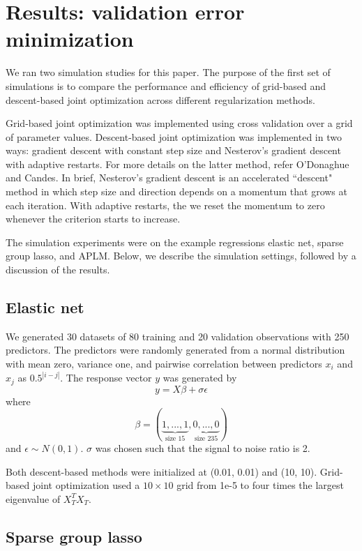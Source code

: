 \documentclass[10pt,letterpaper]{article}
\begin{document}
\section{Results: validation error minimization}

We ran two simulation studies for this paper. The purpose of the first set of simulations is to compare the performance and efficiency of grid-based and descent-based joint optimization across different regularization methods.

Grid-based joint optimization was implemented using cross validation over a grid of parameter values. Descent-based joint optimization was implemented in two ways: gradient descent with constant step size and Nesterov's gradient descent with adaptive restarts. For more details on the latter method, refer O'Donaghue and Candes. In brief, Nesterov's gradient descent is an accelerated ``descent" method in which step size and direction depends on a momentum that grows at each iteration. With adaptive restarts, the we reset the momentum to zero whenever the criterion starts to increase. 

The simulation experiments were on the example regressions elastic net, sparse group lasso, and APLM.  Below, we describe the simulation settings, followed by a discussion of the results.

\subsection{Elastic net}
We generated 30 datasets of 80 training and 20 validation observations with 250 predictors. The predictors were randomly generated from a normal distribution with mean zero, variance one, and pairwise correlation between predictors $x_i$ and $x_j$ as $0.5^{|i-j|}$.
The response vector $y$ was generated by
\begin{equation}
y = X\beta + \sigma \epsilon
\end{equation}
where
\begin{equation}
\beta = (\underbrace{1, ..., 1}_\text{size 15}, \underbrace{0, ..., 0}_\text{size 235})
\end{equation}
and $\epsilon \sim N(0, 1)$. $\sigma$ was chosen such that the signal to noise ratio is 2. 

Both descent-based methods were initialized at (0.01, 0.01) and (10, 10). Grid-based joint optimization used a $10 \times 10$ grid from 1e-5 to four times the largest eigenvalue of $X_T^T X_T$.

\subsection{Sparse group lasso}
\end{document}
